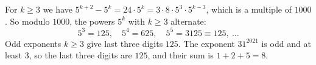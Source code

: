 For $k\ge3$ we have $5^{k+2}-5^k=24\cdot5^k=3\cdot8\cdot5^3\cdot5^{k-3}$, which is a multiple of $1000$. So modulo $1000$, the powers $5^k$ with $k\ge3$ alternate:
\[5^3=125,\quad5^4=625,\quad5^5=3125\equiv125,\ \dots\]
Odd exponents $k\ge3$ give last three digits $125$. The exponent $31^{2021}$ is odd and at least $3$, so the last three digits are $125$, and their sum is $1+2+5=\boxed{8}$.
